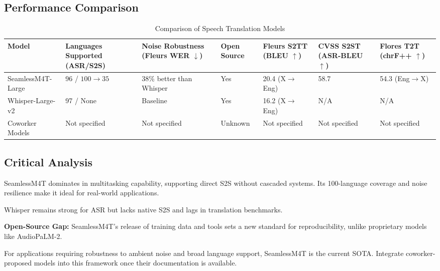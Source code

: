 \subsection{Performance Comparison}

\begin{table}
    \centering
    \caption{Comparison of Speech Translation Models}
    \label{tab:model-comparison}
    \begin{tabular}{|p{2.5cm}|p{2.5cm}|p{2cm}|p{1cm}|p{1.8cm}|p{1.8cm}|p{1.8cm}|}
        \hline
        \textbf{Model} & \textbf{Languages Supported (ASR/S2S)} & \textbf{Noise Robustness (Fleurs WER $\downarrow$)} & \textbf{Open Source} & \textbf{Fleurs S2TT (BLEU $\uparrow$)} & \textbf{CVSS S2ST (ASR-BLEU $\uparrow$)} & \textbf{Flores T2T (chrF++ $\uparrow$)} \\
        \hline
        SeamlessM4T-Large & 96 / $100\rightarrow35$ & 38\% better than Whisper & Yes & 20.4 (X$\rightarrow$Eng) & 58.7 & 54.3 (Eng$\rightarrow$X) \\
        \hline
        Whisper-Large-v2 & 97 / None & Baseline & Yes & 16.2 (X$\rightarrow$Eng) & N/A & N/A \\
        \hline
        Coworker Models & Not specified & Not specified & Unknown & Not specified & Not specified & Not specified \\
        \hline
    \end{tabular}
\end{table}

\subsection{Critical Analysis}
SeamlessM4T dominates in multitasking capability, supporting direct S2S without cascaded systems. Its 100-language coverage and noise resilience make it ideal for real-world applications.

Whisper remains strong for ASR but lacks native S2S and lags in translation benchmarks.

\textbf{Open-Source Gap:} SeamlessM4T's release of training data and tools sets a new standard for reproducibility, unlike proprietary models like AudioPaLM-2.

For applications requiring robustness to ambient noise and broad language support, SeamlessM4T is the current SOTA. Integrate coworker-proposed models into this framework once their documentation is available.